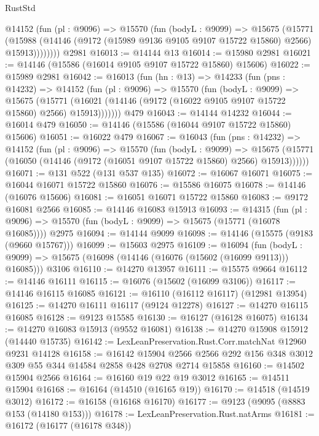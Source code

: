 \begin{lexlean}{RustStd}
\begin{coremodule}
        @14152
          (fun (pl : @9096) =>
          @15570
            (fun (bodyL : @9099) =>
            @15675
              (@15771
                (@15988
                  (@14146 (@9172 (@15989 @9136 @9105 @9107 @15722 @15860) @2566) @15913))))))))
    @2981
@16013 := @14144 @13
@16014 := @15980 @2981
@16021 := @14146 (@15586 (@16014 @9105 @9107 @15722 @15860) @15606)
@16022 := @15989 @2981
@16042 := @16013
    (fun (hn : @13) =>
    @14233
      (fun (pns : @14232) =>
      @14152
        (fun (pl : @9096) =>
        @15570
          (fun (bodyL : @9099) =>
          @15675
            (@15771 (@16021 (@14146 (@9172 (@16022 @9105 @9107 @15722 @15860) @2566) @15913)))))))
    @479
@16043 := @14144 @14232
@16044 := @16014 @479
@16050 := @14146 (@15586 (@16044 @9107 @15722 @15860) @15606)
@16051 := @16022 @479
@16067 := @16043
    (fun (pns : @14232) =>
    @14152
      (fun (pl : @9096) =>
      @15570
        (fun (bodyL : @9099) =>
        @15675 (@15771 (@16050 (@14146 (@9172 (@16051 @9107 @15722 @15860) @2566) @15913))))))
@16071 := @131 @522 (@131 @537 @135)
@16072 := @16067 @16071
@16075 := @16044 @16071 @15722 @15860
@16076 := @15586 @16075
@16078 := @14146 (@16076 @15606)
@16081 := @16051 @16071 @15722 @15860
@16083 := @9172 @16081 @2566
@16085 := @14146 @16083 @15913
@16093 := @14315
    (fun (pl : @9096) => @15570 (fun (bodyL : @9099) => @15675 (@15771 (@16078 @16085))))
    @2975
@16094 := @14144 @9099
@16098 := @14146 (@15575 (@9183 (@9660 @15767)))
@16099 := @15603 @2975
@16109 := @16094
    (fun (bodyL : @9099) => @15675 (@16098 (@14146 (@16076 (@15602 (@16099 @9113))) @16085)))
    @3106
@16110 := @14270 @13957
@16111 := @15575 @9664
@16112 := @14146 @16111
@16115 := @16076 (@15602 (@16099 @3106))
@16117 := @14146 @16115 @16085
@16121 := @16110 (@16112 @16117) (@12981 @13954)
@16125 := @14270 @16111 @16117 (@9124 @12278)
@16127 := @14270 @16115 @16085
@16128 := @9123 @15585
@16130 := @16127 (@16128 @16075)
@16134 := @14270 @16083 @15913 (@9552 @16081)
@16138 := @14270 @15908 @15912 (@14440 @15735)
@16142 := LexLeanPreservation.Rust.Corr.matchNat @12960 @9231 @14128
@16158 := @16142
    @15904
    @2566
    @2566
    @292
    @156
    @348
    @3012
    @309
    @55
    @344
    @14584
    @2858
    @428
    @2708
    @2714
    @15858
@16160 := @14502 @15904 @2566
@16164 := @16160 @19 @22 @19 @3012
@16165 := @14511 @15904
@16168 := @16164 (@14510 (@16165 @19))
@16170 := @14518 (@14519 @3012)
@16172 := @16158 (@16168 @16170)
@16177 := @9123 (@9095 (@8883 @153 (@14180 @153)))
@16178 := LexLeanPreservation.Rust.natArms
@16181 := @16172 (@16177 (@16178 @348))

\end{coremodule}
\end{lexlean}
